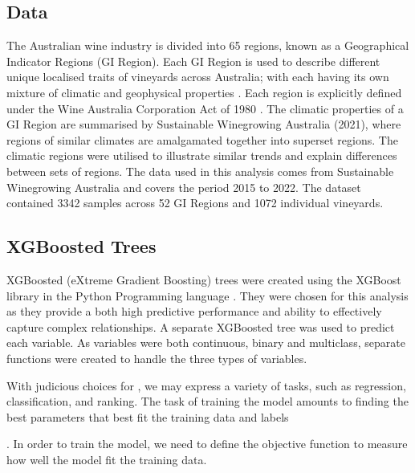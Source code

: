 \documentclass[review,12pt,authoryear]{elsarticle}
\begin{document}
\begin{linenumbers}

\subsection{Data}
The Australian wine industry is divided into 65 regions, known as a Geographical Indicator Regions (GI Region). Each GI Region is used to describe different unique localised traits of vineyards across Australia; with each having its own mixture of climatic and geophysical properties \citep{hallidayAustralianWineEncyclopedia2009,oliverReviewSoilPhysical2013,soarClimateDriversRed2008}. Each region is explicitly defined under the Wine Australia Corporation Act of 1980 \citep{attorney-generalsdepartmentWineAustraliaCorporation2010}. The climatic properties of a GI Region are summarised by Sustainable Winegrowing Australia (2021), where regions of similar climates are amalgamated together into superset regions. The climatic regions were utilised to illustrate similar trends and explain differences between sets of regions.
The data used in this analysis comes from Sustainable Winegrowing Australia and covers the period 2015 to 2022. The dataset contained 3342 samples across 52 GI Regions and 1072 individual vineyards.


\subsection{XGBoosted Trees}
XGBoosted (eXtreme Gradient Boosting) trees were created using the XGBoost library \citep{chenXGBoostScalableTree2016} in the Python Programming language \citep{g.vanrossumPythonTutorialTechnical1995}. They were chosen for this analysis as they provide a both high predictive performance and ability to effectively capture complex relationships. A separate XGBoosted tree was used to predict each variable. As variables were both continuous, binary and multiclass, separate functions were created to handle the three types of variables.

%
With judicious choices for , we may express a variety of tasks, such as regression, classification, and ranking. The task of training the model amounts to finding the best parameters that best fit the training data and labels

. In order to train the model, we need to define the objective function to measure how well the model fit the training data.


\end{linenumbers}
\end{document}
